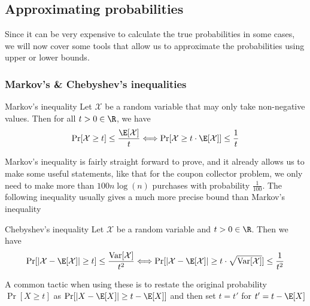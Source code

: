 \newpage
\subsection{Approximating probabilities}
Since it can be very expensive to calculate the true probabilities in some cases, we will now cover some tools that allow us to approximate the probabilities using upper or lower bounds.

\subsubsection{Markov's \& Chebyshev's inequalities}
\setcounter{all}{67}
\begin{theorem}[]{Markov's inequality}
    Let $\mathcal{X}$ be a random variable that may only take non-negative values. Then for all $t > 0 \in \R$, we have
    \begin{align*}
        \Pr[\mathcal{X} \geq t] \leq \frac{\E[\mathcal{X}]}{t} \Longleftrightarrow \Pr[\mathcal{X} \geq t \cdot \E[\mathcal{X}]] \leq \frac{1}{t}
    \end{align*}
\end{theorem}
Markov's inequality is fairly straight forward to prove, and it already allows us to make some useful statements, like that for the coupon collector problem, we only need to make more than $100 n \log(n)$ purchases with probability $\frac{1}{100}$. The following inequality usually gives a much more precise bound than Markov's inequality

\begin{theorem}[]{Chebyshev's inequality}
    Let $\mathcal{X}$ be a random variable and $t > 0 \in\R$. Then we have
    \begin{align*}
        \Pr[|\mathcal{X} - \E[\mathcal{X}]| \geq t] \leq \frac{\text{Var}[\mathcal{X}]}{t^2} \Longleftrightarrow \Pr[|\mathcal{X} - \E[\mathcal{X}]| \geq t \cdot \sqrt{\text{Var}[\mathcal{X}]}] \leq \frac{1}{t^2}
    \end{align*}
\end{theorem}

A common tactic when using these is to restate the original probability $\Pr[X \geq t]$ as $\Pr[|X - \E[X]| \geq t - \E[X]]$ and then set $t = t'$ for $t' = t - \E[X]$

